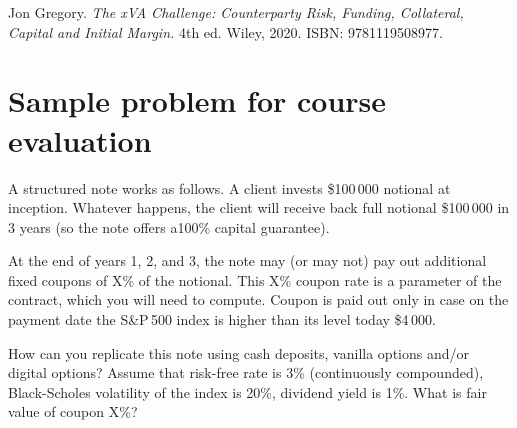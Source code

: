 \documentclass[a4paper,14pt]{extarticle}
\begin{document}
Jon Gregory. \textit{The xVA Challenge: Counterparty Risk, Funding, Collateral, Capital and Initial Margin.}
4th ed. Wiley, 2020. ISBN: 9781119508977.

\section*{Sample problem for course evaluation}
A structured note works as follows. A client invests \$100\,000 notional at inception. Whatever
happens, the client will receive back full notional \$100\,000 in 3 years (so the note offers a100\% capital
guarantee).

At the end of years 1, 2, and 3, the note may (or may not) pay out additional fixed coupons of X\%
of the notional. This X\% coupon rate is a parameter of the contract, which you will need to compute.
Coupon is paid out only in case on the payment date the S\&P\,500 index is higher than its level
today \$4\,000.

How can you replicate this note using cash deposits, vanilla options and/or digital options?
Assume that risk-free rate is 3\% (continuously compounded), Black-Scholes volatility of the
index is 20\%, dividend yield is 1\%. What is fair value of coupon X\%?
\end{document}
